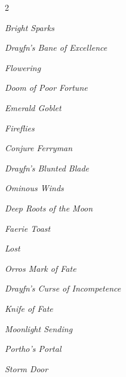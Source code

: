 \documentclass[10pt,a4paper,twoside,bg=print,twocolumn,openany,nodeprecatedcode]{dndbook}
\begin{document}
\begin{description}
\begin{multicols}{2}
{\par \vspace { 9pt plus 3pt minus 3pt } \noindent  {} \nopagebreak }

\begin{description}
\item \textit{Bright Sparks}
\item \textit{Drayfn's Bane of Excellence}
\item \textit{Flowering}
\end{description}

{\par \vspace { 9pt plus 3pt minus 3pt } \noindent  {} \nopagebreak }

\begin{description}
\item \textit{Doom of Poor Fortune}
\item \textit{Emerald Goblet}
\item \textit{Fireflies}
\end{description}

{\par \vspace { 9pt plus 3pt minus 3pt } \noindent  {} \nopagebreak }

\begin{description}
\item \textit{Conjure Ferryman}
\item \textit{Drayfn's Blunted Blade}
\item \textit{Ominous Winds}
\end{description}

{\par \vspace { 9pt plus 3pt minus 3pt } \noindent  {} \nopagebreak }

\begin{description}
\item \textit{Deep Roots of the Moon}
\item \textit{Faerie Toast}
\item \textit{Lost}
\item \textit{Orros Mark of Fate}
\end{description}

{\par \vspace { 9pt plus 3pt minus 3pt } \noindent  {} \nopagebreak }

\begin{description}
\item \textit{Drayfn's Curse of Incompetence}
\item \textit{Knife of Fate}
\item \textit{Moonlight Sending}
\item \textit{Portho's Portal}
\item \textit{Storm Door}
\end{description}


\end{multicols}
\end{description}
\end{document}
